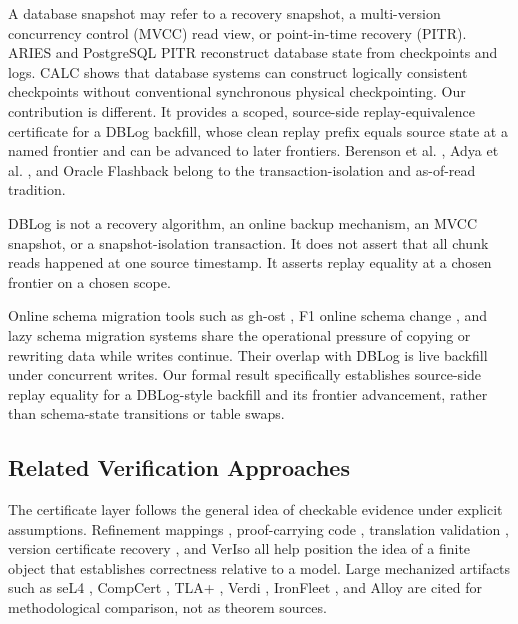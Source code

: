 \documentclass[letterpaper,10pt,twocolumn]{article}
\begin{document}
A database snapshot may refer to a recovery snapshot, a multi-version
concurrency control (MVCC) read view, or point-in-time recovery (PITR).
ARIES \citep{mohan1992aries} and PostgreSQL PITR
\citep{postgres_pitr} reconstruct database state from checkpoints and
logs. CALC \citep{ren2016calc} shows that database systems can construct
logically consistent checkpoints without conventional synchronous
physical checkpointing. Our contribution is different. It provides a
scoped, source-side replay-equivalence certificate for a DBLog backfill,
whose clean replay prefix equals source state at a named frontier and
can be advanced to later frontiers. Berenson et al.
\citep{berenson1995isolation}, Adya et al. \citep{adya2000isolation},
and Oracle Flashback \citep{oracle_flashback} belong to the
transaction-isolation and as-of-read tradition.

DBLog is not a recovery algorithm, an online backup mechanism, an MVCC
snapshot, or a snapshot-isolation transaction. It does not assert that
all chunk reads happened at one source timestamp. It asserts replay
equality at a chosen frontier on a chosen scope.

Online schema migration tools such as gh-ost \citep{ghost2016}, F1
online schema change \citep{rae2013f1}, and lazy schema migration
systems \citep{zeng2024slsm} share the operational pressure of copying or
rewriting data while writes continue. Their overlap with DBLog is live
backfill under concurrent writes. Our formal result specifically
establishes source-side replay equality for a DBLog-style backfill and
its frontier advancement, rather than schema-state transitions or table
swaps.

\subsection{Related Verification Approaches}\label{sec:related-verification-approaches}

The certificate layer follows the general idea of checkable evidence
under explicit assumptions. Refinement mappings \citep{abadi1991refinement},
proof-carrying code \citep{necula1997pcc}, translation validation
\citep{pnueli1998translation}, version certificate recovery
\citep{clark2024vcr}, and VerIso \citep{ghasemirad2025veriso} all help
position the idea of a finite object that establishes correctness relative
to a model. Large mechanized artifacts such as seL4
\citep{klein2009sel4}, CompCert \citep{leroy2009compcert}, TLA+
\citep{lamport2002specifying}, Verdi \citep{wilcox2015verdi}, IronFleet
\citep{hawblitzel2015ironfleet}, and Alloy \citep{jackson2002alloy} are
cited for methodological comparison, not as theorem sources.
\end{document}
